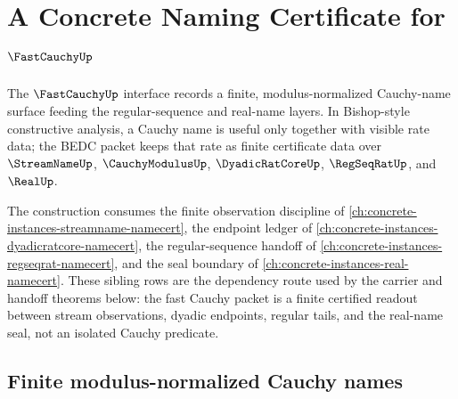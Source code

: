\chapter{A Concrete Naming Certificate for $\FastCauchyUp$}
\label{ch:concrete-instances-fastcauchy-namecert}

The $\FastCauchyUp$ interface records a finite, modulus-normalized Cauchy-name surface feeding the regular-sequence and real-name layers. In Bishop-style constructive analysis, a Cauchy name is useful only together with visible rate data; the BEDC packet keeps that rate as finite certificate data over $\StreamNameUp$, $\CauchyModulusUp$, $\DyadicRatCoreUp$, $\RegSeqRatUp$, and $\RealUp$.

The construction consumes the finite observation discipline of \autoref{ch:concrete-instances-streamname-namecert}, the endpoint ledger of \autoref{ch:concrete-instances-dyadicratcore-namecert}, the regular-sequence handoff of \autoref{ch:concrete-instances-regseqrat-namecert}, and the seal boundary of \autoref{ch:concrete-instances-real-namecert}. These sibling rows are the dependency route used by the carrier and handoff theorems below: the fast Cauchy packet is a finite certified readout between stream observations, dyadic endpoints, regular tails, and the real-name seal, not an isolated Cauchy predicate.

\section{Finite modulus-normalized Cauchy names}
\label{sec:fastcauchy-finite-modulus}

